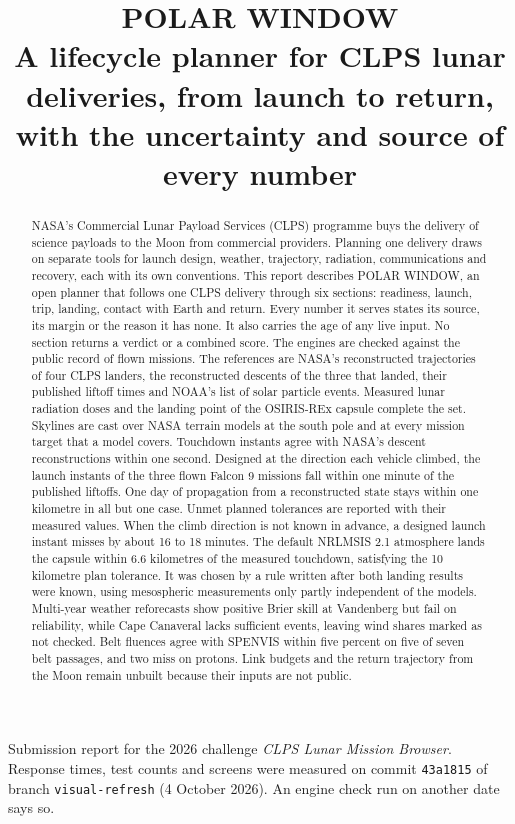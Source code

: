 \documentclass[11pt,a4paper]{article}
\title{\textbf{POLAR WINDOW}\\[3pt]
  \large A lifecycle planner for CLPS lunar deliveries, from launch to return,\\
  with the uncertainty and source of every number}
\author{}
\date{}
\newcommand{\pwcommit}{\texttt{43a1815}}
\begin{document}
\maketitle
\thispagestyle{fancy}
\vspace{-2.4\baselineskip}
\begin{center}\small
Submission report for the 2026 challenge \emph{CLPS Lunar Mission Browser}.
Response times, test counts and screens were measured on commit \pwcommit{} of branch \texttt{visual-refresh} (4 October 2026). An engine check run on another date says so.
\end{center}

\begin{abstract}
NASA's Commercial Lunar Payload Services (CLPS) programme buys the delivery of science payloads to the Moon from commercial providers. Planning one delivery draws on separate tools for launch design, weather, trajectory, radiation, communications and recovery, each with its own conventions. This report describes POLAR WINDOW, an open planner that follows one CLPS delivery through six sections: readiness, launch, trip, landing, contact with Earth and return. Every number it serves states its source, its margin or the reason it has none. It also carries the age of any live input. No section returns a verdict or a combined score. The engines are checked against the public record of flown missions. The references are NASA's reconstructed trajectories of four CLPS landers, the reconstructed descents of the three that landed, their published liftoff times and NOAA's list of solar particle events. Measured lunar radiation doses and the landing point of the OSIRIS-REx capsule complete the set. Skylines are cast over NASA terrain models at the south pole and at every mission target that a model covers. Touchdown instants agree with NASA's descent reconstructions within one second. Designed at the direction each vehicle climbed, the launch instants of the three flown Falcon 9 missions fall within one minute of the published liftoffs. One day of propagation from a reconstructed state stays within one kilometre in all but one case. Unmet planned tolerances are reported with their measured values. When the climb direction is not known in advance, a designed launch instant misses by about 16 to 18 minutes. The default NRLMSIS 2.1 atmosphere lands the capsule within 6.6 kilometres of the measured touchdown, satisfying the 10 kilometre plan tolerance. It was chosen by a rule written after both landing results were known, using mesospheric measurements only partly independent of the models. Multi-year weather reforecasts show positive Brier skill at Vandenberg but fail on reliability, while Cape Canaveral lacks sufficient events, leaving wind shares marked as not checked. Belt fluences agree with SPENVIS within five percent on five of seven belt passages, and two miss on protons. Link budgets and the return trajectory from the Moon remain unbuilt because their inputs are not public.
\end{abstract}
\end{document}
